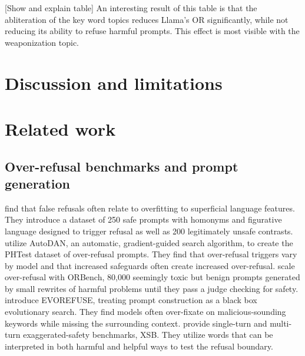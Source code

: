 \documentclass{article}
\begin{document}
[Show and explain table]
An interesting result of this table is that the abliteration of the key word topics reduces Llama's OR significantly, while not reducing its ability to refuse harmful prompts. This effect is most visible with the weaponization topic. 



\section{Discussion and limitations}




\section{Related work}

\subsection{Over-refusal benchmarks and prompt generation}
    \citet{rottger2024xstest} find that false refusals often relate to overfitting to superficial language features. They introduce a dataset of 250 safe prompts with homonyms and figurative language designed to trigger refusal as well as 200 legitimately unsafe contrasts. \citet{an2024phtest} utilize AutoDAN, an automatic, gradient-guided search algorithm, to create the PHTest dataset of over-refusal prompts. They find that over-refusal triggers vary by model and that increased safeguards often create increased over-refusal. \citet{cui2024orbench} scale over-refusal with ORBench, 80{,}000 seemingly toxic but benign prompts generated by small rewrites of harmful problems until they pass a judge checking for safety. \citet{wu2025evorefuse} introduce EVOREFUSE, treating prompt construction as a black box evolutionary search. They find models often over-fixate on malicious-sounding keywords while missing the surrounding context. \citet{yuan2025beyond} provide single-turn and multi-turn exaggerated-safety benchmarks, XSB. They utilize words that can be interpreted in both harmful and helpful ways to test the refusal boundary.
\end{document}
